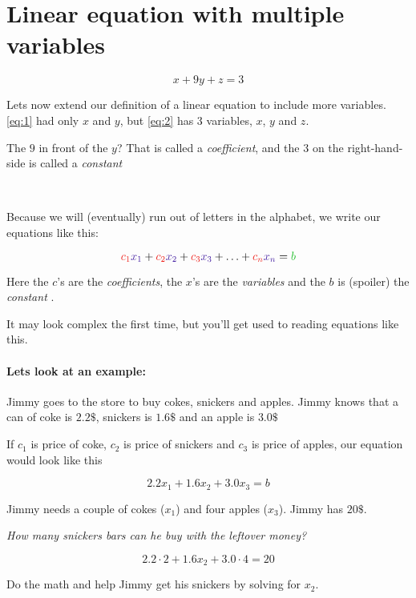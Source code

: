 \documentclass{article}
\begin{document}
\section{Linear equation with multiple variables}

\begin{equation} \label{eq:2}
x + 9y + z = 3
\end{equation}

Lets now extend our definition of a linear equation to include more variables. \eqref{eq:1} had only $x$ and $y$, but \eqref{eq:2} has 3 variables, $x$, $y$ and $z$. 

The $9$ in front of the $y$? That is called a \textit{coefficient}, and the $3$ on the right-hand-side is called a \textit{constant}

\

Because we will (eventually) run out of letters in the alphabet, we write our equations like this:

\[
\color{rooj}c_1\color{blou}x_1\color{black} + \color{rooj}c_2\color{blou}x_2\color{black} + \color{rooj}c_3\color{blou}x_3\color{black} + \dots\color{black} + \color{rooj}c_n\color{blou}x_n\color{black} = \color{groen} b \color{black}
\]

Here the $c$'s are the \color{rooj} \textit{coefficients}\color{black}, the $x$'s are the \color{blou}  \textit{variables} \color{black}  and the $b$ is (spoiler) the \color{groen} \textit{constant} \color{black} . 

It may look complex the first time, but you'll get used to reading equations like this.

\paragraph{Lets look at an example:}

Jimmy goes to the store to buy cokes, snickers and apples. Jimmy knows that a can of coke is $2.2\$$, snickers is $1.6\$$ and an apple is $3.0\$$

If $c_1$ is price of coke, $c_2$ is price of snickers and $c_3$ is price of apples, our equation would look like this

\[
2.2x_1 + 1.6x_2 + 3.0x_3 = b
\]

Jimmy needs a couple of cokes ($x_1$) and four apples ($x_3$). Jimmy has $20\$$.

\textit{How many snickers bars can he buy with the leftover money?}

\[
2.2\cdot 2 + 1.6x_2 + 3.0\cdot 4 = 20
\]

Do the math and help Jimmy get his snickers by solving for $x_2$. 
\end{document}
